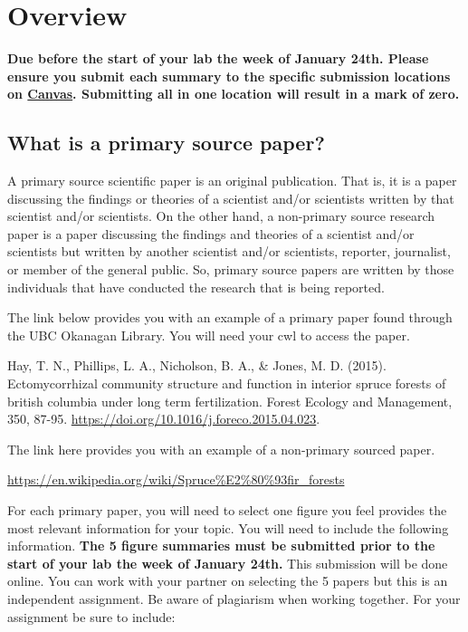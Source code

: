 \documentclass[
]{book}
\begin{document}
\hypertarget{overview}{%
\section*{Overview}\label{overview}}

\textbf{Due before the start of your lab the week of January 24th. Please ensure you submit each summary to the specific submission locations on \href{https://canvas.ubc.ca/courses/113910}{Canvas}. Submitting all in one location will result in a mark of zero.}

\hypertarget{what-is-a-primary-source-paper}{%
\subsection*{What is a primary source paper?}\label{what-is-a-primary-source-paper}}

A primary source scientific paper is an original publication. That is, it is a paper discussing the findings or theories of a scientist and/or scientists written by that scientist and/or scientists. On the other hand, a non-primary source research paper is a paper discussing the findings and theories of a scientist and/or scientists but written by another scientist and/or scientists, reporter, journalist, or member of the general public. So, primary source papers are written by those individuals that have conducted the research that is being reported.

The link below provides you with an example of a primary paper found through the UBC Okanagan Library. You will need your cwl to access the paper.

Hay, T. N., Phillips, L. A., Nicholson, B. A., \& Jones, M. D. (2015). Ectomycorrhizal community structure and function in interior spruce forests of british columbia under long term fertilization. Forest Ecology and Management, 350, 87-95. \url{https://doi.org/10.1016/j.foreco.2015.04.023}.

The link here provides you with an example of a non-primary sourced paper.

\url{https://en.wikipedia.org/wiki/Spruce\%E2\%80\%93fir_forests}

For each primary paper, you will need to select one figure you feel provides the most relevant information for your topic. You will need to include the following information. \textbf{The 5 figure summaries must be submitted prior to the start of your lab the week of January 24th.} This submission will be done online. You can work with your partner on selecting the 5 papers but this is an independent assignment. Be aware of plagiarism when working together. For your assignment be sure to include:
\end{document}
